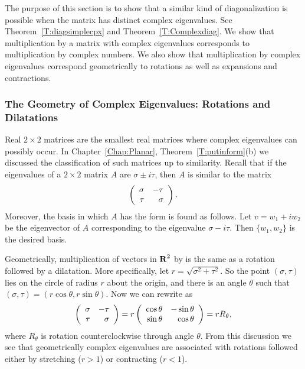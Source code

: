 The purpose of this section is to show that a similar kind of diagonalization 
is possible when the matrix has distinct complex eigenvalues. See
Theorem~\ref{T:diagsimplecpx} and Theorem~\ref{T:Complexdiag}.  We show 
that multiplication by a matrix with complex eigenvalues corresponds
to multiplication by complex numbers.  We also show that multiplication by 
complex eigenvalues correspond geometrically to rotations 
as well as expansions and contractions.

\subsubsection*{The Geometry of Complex Eigenvalues: Rotations and
Dilatations}

Real $2\times 2$ matrices are the smallest real matrices where complex 
eigenvalues can possibly occur.  In Chapter~\ref{Chap:Planar}, 
Theorem~\ref{T:putinform}(b) we discussed the classification of such matrices 
up to similarity.  Recall that if the eigenvalues of a $2\times 2$ matrix $A$ 
are $\sigma\pm i\tau$, 
then $A$ is similar to the matrix 
\begin{equation} \label{E:normalfm2}
\left(\begin{array}{rr} \sigma & -\tau\\ \tau &\sigma\end{array}\right).
\end{equation}
Moreover, the basis in which $A$ has the form  is found
as follows.  Let $v=w_1+iw_2$ be the eigenvector of $A$ corresponding to 
the eigenvalue $\sigma-i\tau$.  Then $\{w_1,w_2\}$ is the desired 
basis.

Geometrically, multiplication of vectors in $\mbox{$\bf{R}$}^2$ by  is 
the same as a rotation followed by a dilatation.  More 
specifically, let $r=\sqrt{\sigma^2+\tau^2}$.  So the point $(\sigma,\tau)$ 
lies on the circle of radius $r$ about the origin, and there is an angle 
$\theta$ such that $(\sigma,\tau)=(r\cos\theta,r\sin\theta)$.  Now we can 
rewrite  as
\[
\left(\begin{array}{rr} \sigma & -\tau\\ \tau &\sigma\end{array}\right)
= r\left(\begin{array}{rr} \cos\theta & -\sin{\theta}\\ \sin\theta &\cos\theta\end{array}\right)=rR_{\theta},
\]
where $R_\theta$ is rotation counterclockwise through angle $\theta$.  From 
this discussion we see that geometrically complex eigenvalues are associated 
with rotations followed either by stretching ($r>1$) or contracting ($r<1$).

